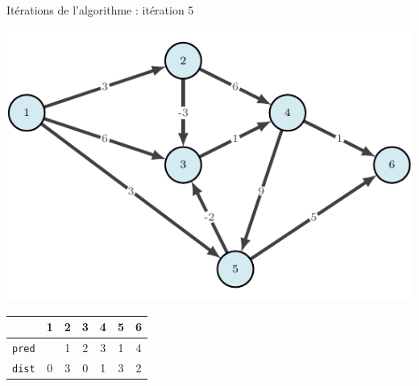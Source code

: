 \begin{frame}{Itérations de l'algorithme : itération 5}
    \begin{center}
        \includegraphics[height=.6\textheight]{fig/bellman-0.pdf}      
    \begin{tabular}{c|cccccc}
      
        & 1    &2      &3      &4      &5      &6      \\
        \hline
        \texttt{pred} & &1      &2      &3      &1      &4     \\
        \texttt{dist} & 0       &3      &0      &1      &3      &2 \\                    \end{tabular}
\end{center}
\end{frame}

